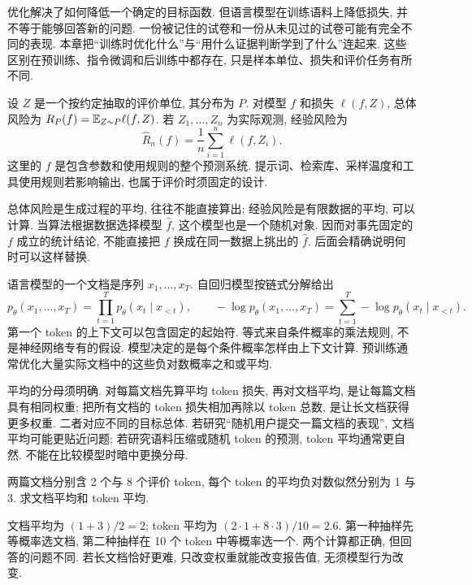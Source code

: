 \label{ch:learning}
优化解决了如何降低一个确定的目标函数. 但语言模型在训练语料上降低损失, 并不等于能够回答新的问题. 一份被记住的试卷和一份从未见过的试卷可能有完全不同的表现. 本章把“训练时优化什么”与“用什么证据判断学到了什么”连起来. 这些区别在预训练、指令微调和后训练中都存在, 只是样本单位、损失和评价任务有所不同.

\begin{definition}
设 $Z$ 是一个按约定抽取的评价单位, 其分布为 $P$. 对模型 $f$ 和损失 $\ell(f,Z)$, 总体风险为 $R_P(f)=\mathbb E_{Z\sim P}\ell(f,Z)$. 若 $Z_1,\ldots,Z_n$ 为实际观测, 经验风险为
\[
\widehat R_n(f)=\frac1n\sum_{i=1}^n\ell(f,Z_i).
\]
这里的 $f$ 是包含参数和使用规则的整个预测系统. 提示词、检索库、采样温度和工具使用规则若影响输出, 也属于评价时须固定的设计.
\end{definition}
总体风险是生成过程的平均, 往往不能直接算出; 经验风险是有限数据的平均, 可以计算. 当算法根据数据选择模型 $\widehat f$, 这个模型也是一个随机对象. 因而对事先固定的 $f$ 成立的统计结论, 不能直接把 $f$ 换成在同一数据上挑出的 $\widehat f$. 后面会精确说明何时可以这样替换.

语言模型的一个文档是序列 $x_1,\ldots,x_T$. 自回归模型按链式分解给出
\[
p_\theta(x_1,\ldots,x_T)=\prod_{t=1}^T p_\theta(x_t\mid x_{<t}),\qquad
-\log p_\theta(x_1,\ldots,x_T)=\sum_{t=1}^T-\log p_\theta(x_t\mid x_{<t}).
\]
第一个 token 的上下文可以包含固定的起始符. 等式来自条件概率的乘法规则, 不是神经网络专有的假设. 模型决定的是每个条件概率怎样由上下文计算. 预训练通常优化大量实际文档中的这些负对数概率之和或平均.

平均的分母须明确. 对每篇文档先算平均 token 损失, 再对文档平均, 是让每篇文档具有相同权重; 把所有文档的 token 损失相加再除以 token 总数, 是让长文档获得更多权重. 二者对应不同的目标总体. 若研究“随机用户提交一篇文档的表现”, 文档平均可能更贴近问题; 若研究语料压缩或随机 token 的预测, token 平均通常更自然. 不能在比较模型时暗中更换分母.

\begin{example}
两篇文档分别含 2 个与 8 个评价 token, 每个 token 的平均负对数似然分别为 1 与 3. 求文档平均和 token 平均.
\end{example}
\begin{solution}
文档平均为 $(1+3)/2=2$; token 平均为 $(2\cdot1+8\cdot3)/10=2.6$. 第一种抽样先等概率选文档, 第二种抽样在 10 个 token 中等概率选一个. 两个计算都正确, 但回答的问题不同. 若长文档恰好更难, 只改变权重就能改变报告值, 无须模型行为改变.
\end{solution}

